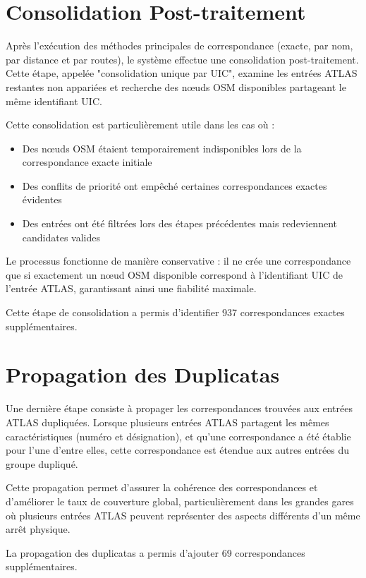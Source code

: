 \section{Consolidation Post-traitement}

Après l'exécution des méthodes principales de correspondance (exacte, par nom, par distance et par routes), le système effectue une consolidation post-traitement. Cette étape, appelée "consolidation unique par UIC", examine les entrées ATLAS restantes non appariées et recherche des nœuds OSM disponibles partageant le même identifiant UIC.

Cette consolidation est particulièrement utile dans les cas où :
\begin{itemize}
    \item Des nœuds OSM étaient temporairement indisponibles lors de la correspondance exacte initiale
    \item Des conflits de priorité ont empêché certaines correspondances exactes évidentes
    \item Des entrées ont été filtrées lors des étapes précédentes mais redeviennent candidates valides
\end{itemize}

Le processus fonctionne de manière conservative : il ne crée une correspondance que si exactement un nœud OSM disponible correspond à l'identifiant UIC de l'entrée ATLAS, garantissant ainsi une fiabilité maximale.

Cette étape de consolidation a permis d'identifier 937 correspondances exactes supplémentaires.

\section{Propagation des Duplicatas}

Une dernière étape consiste à propager les correspondances trouvées aux entrées ATLAS dupliquées. Lorsque plusieurs entrées ATLAS partagent les mêmes caractéristiques (numéro et désignation), et qu'une correspondance a été établie pour l'une d'entre elles, cette correspondance est étendue aux autres entrées du groupe dupliqué.

Cette propagation permet d'assurer la cohérence des correspondances et d'améliorer le taux de couverture global, particulièrement dans les grandes gares où plusieurs entrées ATLAS peuvent représenter des aspects différents d'un même arrêt physique.

La propagation des duplicatas a permis d'ajouter 69 correspondances supplémentaires.

